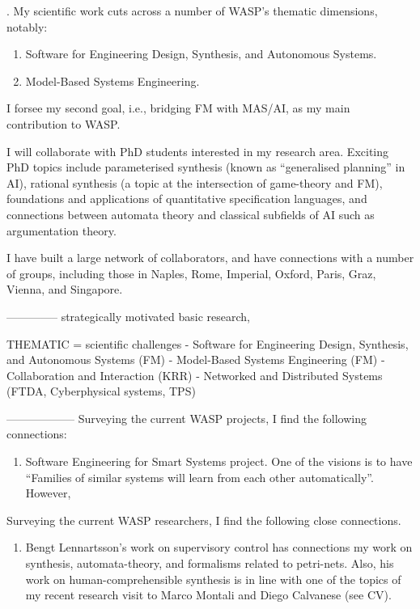 \documentclass[a4paper]{article}
\newcommand{\head}[1]{\noindent {\bf #1}.}
\def\FM{{\sf FM}\xspace}
\def\AI{{\sf AI}\xspace}
\def\MAS{{\sf MAS}\xspace}
\def\WASP{{\sf WASP}\xspace}
\begin{document}
\head{Integration in \WASP}
My scientific work cuts across a number of \WASP's thematic dimensions, notably:
\begin{enumerate}
 \item Software for Engineering Design, Synthesis, and Autonomous Systems.  %
 \item Model-Based Systems Engineering. 
\end{enumerate}


I forsee my second goal, i.e., bridging \FM with \MAS/\AI, as my main contribution to \WASP.

I will collaborate with PhD students interested in my research area.  Exciting
PhD topics include parameterised synthesis (known as ``generalised planning'' in
\AI), rational synthesis (a topic at the intersection of
game-theory and \FM), foundations and applications of quantitative specification
languages, and connections between automata theory and classical subfields of
\AI such as argumentation theory. 

I have built a large network of collaborators, and have connections with a
number of groups, including those in Naples, Rome, Imperial, Oxford, Paris,
Graz, Vienna, and Singapore. 



--------------
strategically motivated basic research, 

THEMATIC = scientific challenges
- Software for Engineering Design, Synthesis, and Autonomous Systems (FM)
- Model-Based Systems Engineering (FM)
- Collaboration and Interaction (KRR)
- Networked and Distributed Systems (FTDA, Cyberphysical systems, TPS)

------------------
Surveying the current \WASP projects, I find the following connections:
\begin{enumerate}
\item Software Engineering for Smart Systems project. One of the visions is to have ``Families of similar systems will learn from each other automatically''. However, 
\end{enumerate}



Surveying the current \WASP researchers, I find the following close connections.

\begin{enumerate}
 \item Bengt Lennartsson's work on supervisory control has connections my work on synthesis, automata-theory, and formalisms related to petri-nets. 
 Also, his work on human-comprehensible synthesis is in line with one of the topics of my recent research visit to Marco Montali and Diego Calvanese (see CV).
 
\end{enumerate}
\end{document}
